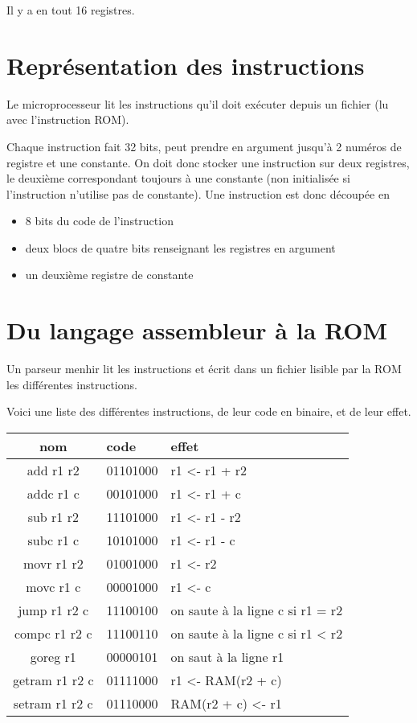 \documentclass[12pt,a4paper,french]{article}
\begin{document}
Il y a en tout 16 registres.



\section{Représentation des instructions}

Le microprocesseur lit les instructions qu'il doit exécuter depuis un fichier (lu avec l'instruction ROM).

Chaque instruction fait 32 bits, peut prendre en argument jusqu'à 2 numéros de registre et une constante. On doit donc stocker une instruction sur deux registres, le deuxième correspondant toujours à une constante (non initialisée si l'instruction n'utilise pas de constante). Une instruction est donc découpée en 

\begin{itemize}
    \item 8 bits du code de l'instruction
    \item deux blocs de quatre bits renseignant les registres en argument
    \item un deuxième registre de constante
\end{itemize}


\section{Du langage assembleur à la ROM}

Un parseur menhir lit les instructions et écrit dans un fichier lisible par la ROM les différentes instructions.

Voici une liste des différentes instructions, de leur code en binaire, et de leur effet.

\;



\begin{tabularx}{15cm}{|c|p{4cm}|X|}
    \hline
    nom & code & effet \\
    \hline
    add r1 r2 & 01101000 & r1 <- r1 + r2 \\
    \hline
    addc r1 c & 00101000 & r1 <- r1 + c \\
    \hline
    sub r1 r2 & 11101000 & r1 <- r1 - r2 \\
    \hline
    subc r1 c & 10101000 & r1 <- r1 - c \\
    \hline
    movr r1 r2 & 01001000 & r1 <- r2 \\
    \hline
    movc r1 c & 00001000 & r1 <- c \\
    \hline
    jump r1 r2 c & 11100100 & on saute à la ligne c si r1 = r2 \\
    \hline
    compc r1 r2 c & 11100110 & on saute à la ligne c si r1 < r2 \\
    \hline
    goreg r1 & 00000101 & on saut à la ligne r1\\
    \hline
    getram r1 r2 c & 01111000 & r1 <- RAM(r2 + c) \\
    \hline
    setram r1 r2 c & 01110000 & RAM(r2 + c) <- r1 \\
    \hline
\end{tabularx}
\end{document}
